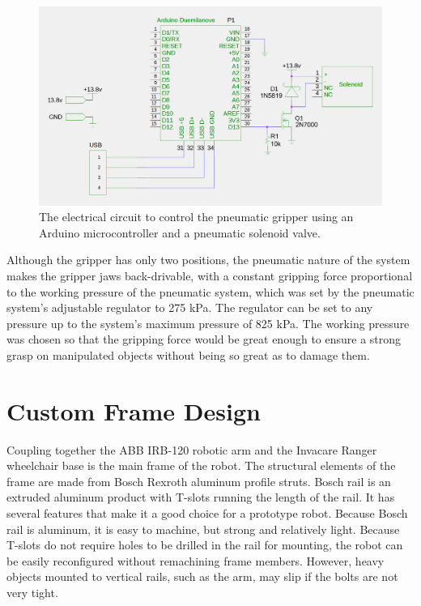 \documentclass[]{cwru} %
\begin{document}
\begin{figure}[ht]
\centering
\includegraphics[width=6.0in]{gripper}
\caption{The electrical circuit to control the pneumatic gripper using 
an Arduino microcontroller and a pneumatic solenoid valve.}
\label{fig:gripper-schematic}
\end{figure}

Although the gripper has only two positions, the pneumatic nature of the
system makes the gripper jaws back-drivable, with a constant gripping
force proportional to the working pressure of the pneumatic system,
which was set by the pneumatic system's adjustable regulator to 275 kPa.
The regulator can be set to any pressure up to the system's maximum
pressure of 825 kPa. The working pressure was chosen so that the
gripping force would be great enough to ensure a strong grasp on
manipulated objects without being so great as to damage
them.

\section{Custom Frame Design}

Coupling together the ABB IRB-120 robotic arm and the Invacare Ranger
wheelchair base is the main frame of the robot. The structural elements
of the frame are made from Bosch Rexroth aluminum profile struts. Bosch
rail is an extruded aluminum product with T-slots running the length of
the rail. It has several features that make it a good choice for a
prototype robot. Because Bosch rail is aluminum, it is easy to machine,
but strong and relatively light. Because T-slots do not require holes to
be drilled in the rail for mounting, the robot can be easily
reconfigured without remachining frame members. However, heavy objects
mounted to vertical rails, such as the arm, may slip if the bolts are
not very tight.
\end{document}
